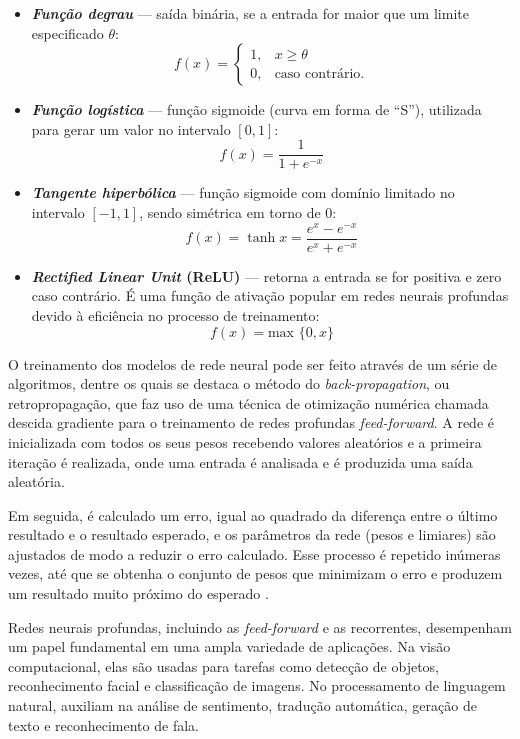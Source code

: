 \documentclass[
	12pt,				%
	openright,			%
	twoside,			%
	a4paper,			%
	tcc,			%
	]{ABNT-DC-UEL}
\begin{document}
\begin{itemize}
    \item \textbf{\textit{Função degrau}} --- saída binária, se a entrada for maior que um limite especificado $\theta$:
    \[f(x) = \begin{cases}
        1, & x \geq \theta\\
        0, & \text{caso contrário}.
    \end{cases}\]
    \item \textbf{\textit{Função logística}} --- função sigmoide (curva em forma de ``S''), utilizada para gerar um valor no intervalo $[0,1]$:
    \[
        f(x) = \frac{1}{1+e^{-x}}
    \]
    \item \textbf{\textit{Tangente hiperbólica}} --- função sigmoide com domínio limitado no intervalo $[-1,1]$, sendo simétrica em torno de $0$:
    \[
        f(x) = \tanh{x} = \frac{e^x - e^{-x}}{e^x + e^{-x}}
    \]
    \item \textbf{\textit{Rectified Linear Unit} (ReLU)} --- retorna a entrada se for positiva e zero caso contrário. É uma função de ativação popular em redes neurais profundas devido à eficiência no processo de treinamento:
    \[
        f(x) = \text{max }\{0, x\}
    \]
\end{itemize}

O treinamento dos modelos de rede neural pode ser feito através de um série de algoritmos, dentre os quais se destaca o método do \textit{back-propagation}, ou retropropagação, que faz uso de uma técnica de otimização numérica chamada descida gradiente para o treinamento de redes profundas \textit{feed-forward}. A rede é inicializada com todos os seus pesos recebendo valores aleatórios e a primeira iteração é realizada, onde uma entrada é analisada e é produzida uma saída aleatória. 

Em seguida, é calculado um erro, igual ao quadrado da diferença entre o último resultado e o resultado esperado, e os parâmetros da rede (pesos e limiares) são ajustados de modo a reduzir o erro calculado. Esse processo é repetido inúmeras vezes, até que se obtenha o conjunto de pesos que minimizam o erro e produzem um resultado muito próximo do esperado \cite{krogh:08}.

Redes neurais profundas, incluindo as \textit{feed-forward} e as recorrentes, desempenham um papel fundamental em uma ampla variedade de aplicações. Na visão computacional, elas são usadas para tarefas como detecção de objetos, reconhecimento facial e classificação de imagens. No processamento de linguagem natural, auxiliam na análise de sentimento, tradução automática, geração de texto e reconhecimento de fala. 
\end{document}
